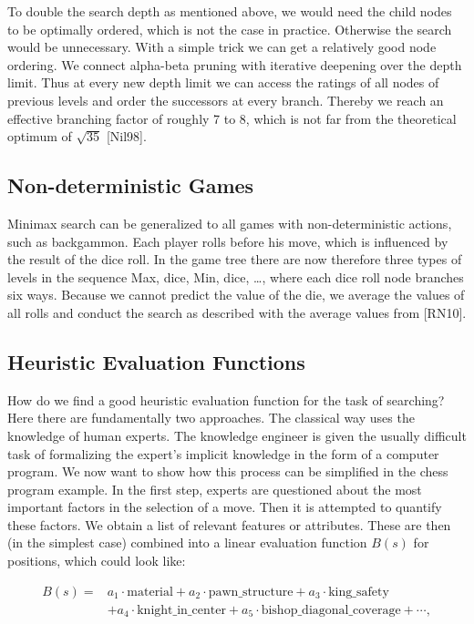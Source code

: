 \documentclass[10pt]{book}
\begin{document}
To double the search depth as mentioned above, we would need the child nodes to be optimally ordered, which is not the case in practice. Otherwise the search would be unnecessary. With a simple trick we can get a relatively good node ordering. We connect alpha-beta pruning with iterative deepening over the depth limit. Thus at every new depth limit we can access the ratings of all nodes of previous levels and order the successors at every branch. Thereby we reach an effective branching factor of roughly 7 to 8, which is not far from the theoretical optimum of $\sqrt{35}$ [Nil98].

\subsection{Non-deterministic Games}
Minimax search can be generalized to all games with non-deterministic actions, such as backgammon. Each player rolls before his move, which is influenced by the result of the dice roll. In the game tree there are now therefore three types of levels in the sequence
Max, dice, Min, dice, \ldots,
where each dice roll node branches six ways. Because we cannot predict the value of the die, we average the values of all rolls and conduct the search as described with the average values from [RN10].

\subsection{Heuristic Evaluation Functions}
How do we find a good heuristic evaluation function for the task of searching? Here there are fundamentally two approaches. The classical way uses the knowledge of human experts. The knowledge engineer is given the usually difficult task of formalizing the expert's implicit knowledge in the form of a computer program. We now want to show how this process can be simplified in the chess program example.
In the first step, experts are questioned about the most important factors in the selection of a move. Then it is attempted to quantify these factors. We obtain a list of relevant features or attributes. These are then (in the simplest case) combined into a linear evaluation function $B(s)$ for positions, which could look like:

\begin{align*}
B(s)= & a_{1} \cdot \text{material}+a_{2} \cdot \text{pawn\_structure}+a_{3} \cdot \text{king\_safety} \\
& +a_{4} \cdot \text{knight\_in\_center}+a_{5} \cdot \text{bishop\_diagonal\_coverage}+\cdots, \tag{6.3}
\end{align*}
\end{document}
